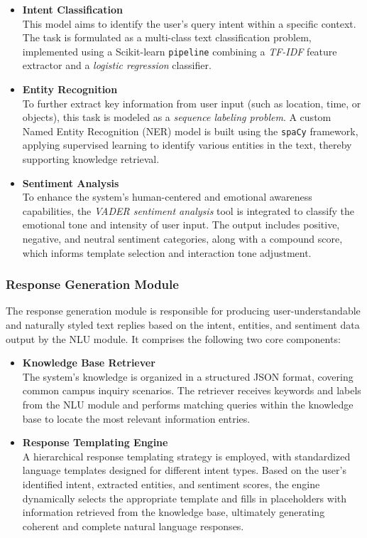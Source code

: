 \documentclass{xum_review}
\begin{document}
	\begin{itemize}
		\item{\textbf{Intent Classification}}\\
		This model aims to identify the user's query intent within a specific context. The task is formulated as a
		multi-class text classification problem, implemented using a Scikit-learn \texttt{pipeline} combining a \textit{TF-IDF} feature
		extractor and a \textit{logistic regression} classifier.
		\item{\textbf{Entity Recognition}}\\
		To further extract key information from user input (such as location, time, or objects), this task is modeled as a
		\textit{sequence labeling problem}. A custom Named Entity Recognition (NER) model is built using the \texttt{spaCy} framework,
		applying supervised learning to identify various entities in the text, thereby supporting knowledge retrieval.
		\item{\textbf{Sentiment Analysis}}\\
		To enhance the system's human-centered and emotional awareness capabilities, the \textit{VADER sentiment analysis} tool is
		integrated to classify the emotional tone and intensity of user input. The output includes positive, negative, and
		neutral sentiment categories, along with a compound score, which informs template selection and interaction tone
		adjustment.
	\end{itemize}

	\subsubsection{Response Generation Module}

	The response generation module is responsible for producing user-understandable and naturally styled text replies based
	on the intent, entities, and sentiment data output by the NLU module. It comprises the following two core components:

	\begin{itemize}
		\item{\textbf{Knowledge Base Retriever}}\\
		The system's knowledge is organized in a structured JSON format, covering common campus inquiry scenarios. The
		retriever receives keywords and labels from the NLU module and performs matching queries within the knowledge base
		to locate the most relevant information entries.
		\item{\textbf{Response Templating Engine}}\\
		A hierarchical response templating strategy is employed, with standardized language templates designed for different
		intent types. Based on the user's identified intent, extracted entities, and sentiment scores, the engine
		dynamically selects the appropriate template and fills in placeholders with information retrieved from the knowledge
		base, ultimately generating coherent and complete natural language responses.
	\end{itemize}
\end{document}
